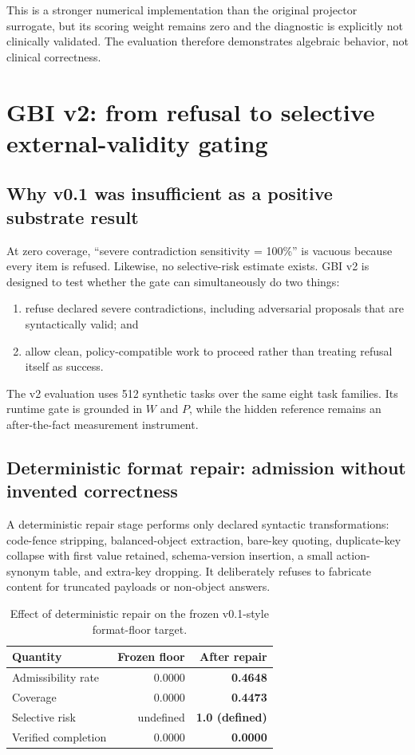 \documentclass[11pt]{article}
\begin{document}
This is a stronger numerical implementation than the original projector surrogate, but its scoring weight remains zero and the diagnostic is explicitly not clinically validated. The evaluation therefore demonstrates algebraic behavior, not clinical correctness.

\section{GBI v2: from refusal to selective external-validity gating}

\subsection{Why v0.1 was insufficient as a positive substrate result}

At zero coverage, ``severe contradiction sensitivity = 100\%'' is vacuous because every item is refused. Likewise, no selective-risk estimate exists. GBI v2 is designed to test whether the gate can simultaneously do two things:

\begin{enumerate}
  \item refuse declared severe contradictions, including adversarial proposals that are syntactically valid; and
  \item allow clean, policy-compatible work to proceed rather than treating refusal itself as success.
\end{enumerate}

The v2 evaluation uses 512 synthetic tasks over the same eight task families. Its runtime gate is grounded in \(W\) and \(P\), while the hidden reference remains an after-the-fact measurement instrument.

\subsection{Deterministic format repair: admission without invented correctness}

A deterministic repair stage performs only declared syntactic transformations: code-fence stripping, balanced-object extraction, bare-key quoting, duplicate-key collapse with first value retained, schema-version insertion, a small action-synonym table, and extra-key dropping. It deliberately refuses to fabricate content for truncated payloads or non-object answers.

\begin{table}[H]
\centering
\caption{Effect of deterministic repair on the frozen v0.1-style format-floor target.}
\begin{tabular}{lrr}
\toprule
Quantity & Frozen floor & After repair\\
\midrule
Admissibility rate & 0.0000 & \textbf{0.4648}\\
Coverage & 0.0000 & \textbf{0.4473}\\
Selective risk & undefined & \textbf{1.0 (defined)}\\
Verified completion & 0.0000 & \textbf{0.0000}\\
\bottomrule
\end{tabular}
\end{table}
\end{document}
